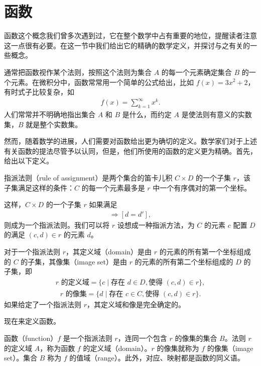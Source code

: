 \documentclass[../../main.tex]{subfiles}
\begin{document}
\section{函数}\label{section:ch01-函数}

函数这个概念我们曾多次遇到过，它在整个数学中占有重要的地位，提醒读者注意这一点很有必要。在这一节中我们给出它的精确的数学定义，并探讨与之有关的一些概念。

通常把函数视作某个法则，按照这个法则为集合 $A$ 的每一个元素确定集合 $B$ 的一个元素。在微积分中，函数常常用一个简单的公式给出，比如 $f(x) = 3x^{2} + 2$，有时式子比较复杂，如
\begin{align*}
f(x) = \sum_{k=1}^{\infty} x^{k}.
\end{align*}
人们常常并不明确地指出集合 $A$ 和 $B$ 是什么，而约定 $A$ 是使法则有意义的实数集，$B$ 就是整个实数集。

然而，随着数学的进展，人们需要对函数给出更为确切的定义。数学家们对于上述有关函数的提法尽管予以认同，但是，他们所使用的函数的定义更为精确。首先，给出以下定义。

\begin{definition}[指派法则]\label{definition:ch01-指派法则}
指派法则（rule of assignment）是两个集合的笛卡儿积 $C \times D$ 的一个子集 $r$，该子集满足这样的条件：$C$ 的每一个元素最多是 $r$ 中一个有序偶对的第一个坐标。
\end{definition}

这样，$C \times D$ 的一个子集 $r$ 如果满足
\begin{align*}
[(c, d) \in r \text{ 并且 } (c, d') \in r] \Longrightarrow [d = d'],
\end{align*}
则成为一个指派法则。我们可以将 $r$ 设想成一种指派方法，为 $C$ 的元素 $c$ 配置 $D$ 的满足 $(c, d) \in r$ 的元素 $d$。

对于一个指派法则 $r$，其定义域（domain）是由 $r$ 的元素的所有第一个坐标组成的 $C$ 的子集，其像集（image set）是由 $r$ 的元素的所有第二个坐标组成的 $D$ 的子集，即
\begin{align*}
r \text{ 的定义域} = \{c \mid \text{存在 } d \in D, \text{使得 } (c, d) \in r\},
\end{align*}
\begin{align*}
r \text{ 的像集} = \{d \mid \text{存在 } c \in C, \text{使得 } (c, d) \in r\}.
\end{align*}
如果给定了一个指派法则 $r$，其定义域和像是完全确定的。

现在来定义函数。

\begin{definition}[函数]\label{definition:ch01-函数}
函数（function）$f$ 是一个指派法则 $r$，连同一个包含 $r$ 的像集的集合 $B$。法则 $r$ 的定义域 $A$，称为函数 $f$ 的定义域（domain）。$r$ 的像集就称为 $f$ 的像集（image set）。集合 $B$ 称为 $f$ 的值域（range）。此外，对应、映射都是函数的同义语。
\end{definition}
\end{document}
